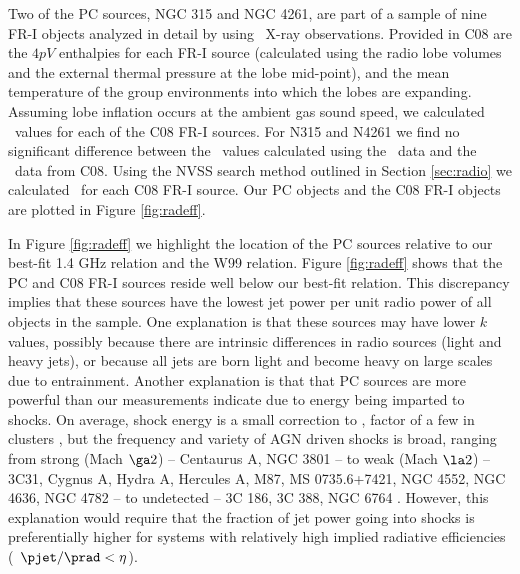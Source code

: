 \documentclass{emulateapj}
\begin{document}
Two of the PC sources, NGC 315 and NGC 4261, are part of a sample of
nine FR-I objects analyzed in detail by \citet[][hereafter
C08]{2008MNRAS.386.1709C} using \xmm\ X-ray observations. Provided in
C08 are the $4pV$ enthalpies for each FR-I source (calculated using
the radio lobe volumes and the external thermal pressure at the lobe
mid-point), and the mean temperature of the group environments into
which the lobes are expanding. Assuming lobe inflation occurs at the
ambient gas sound speed, we calculated \pcav\ values for each of the
C08 FR-I sources. For N315 and N4261 we find no significant difference
between the \pcav\ values calculated using the \chandra\ data and the
\xmm\ data from C08. Using the NVSS search method outlined in Section
\ref{sec:radio} we calculated \phigh\ for each C08 FR-I source. Our PC
objects and the C08 FR-I objects are plotted in Figure
\ref{fig:radeff}.

In Figure \ref{fig:radeff} we highlight the location of the PC sources
relative to our best-fit 1.4 GHz relation and the W99 relation. Figure
\ref{fig:radeff} shows that the PC and C08 FR-I sources reside well
below our best-fit relation. This discrepancy implies that these
sources have the lowest jet power per unit radio power of all objects
in the sample. One explanation is that these sources may have lower
$k$ values, possibly because there are intrinsic differences in radio
sources (light and heavy jets), or because all jets are born light and
become heavy on large scales due to entrainment. Another explanation
is that that PC sources are more powerful than our measurements
indicate due to energy being imparted to shocks. On average, shock
energy is a small correction to \pcav, factor of a few in clusters
\citep{mcnamrev}, but the frequency and variety of AGN driven shocks
is broad, ranging from strong (Mach $\ga 2$) -- Centaurus A, NGC 3801
\citep{2003ApJ...592..129K, 2009MNRAS.395.1999C, 2007ApJ...660..191C}
-- to weak (Mach $\la 2$) -- 3C31, Cygnus A, Hydra A, Hercules A, M87,
MS 0735.6+7421, NGC 4552, NGC 4636, NGC 4782
\citep{2002MNRAS.336.1161L, 2006ApJ...644L...9W, hydraa, herca,
  2007ApJ...665.1057F, ms0735, 2006ApJ...648..947M,
  2009arXiv0909.2942B, 2007ApJ...664..804M} -- to undetected -- 3C
186, 3C 388, NGC 6764 \citep{2008ApJ...684..811S, 2006ApJ...639..753K,
  2008ApJ...688..190C}. However, this explanation would require that
the fraction of jet power going into shocks is preferentially higher
for systems with relatively high implied radiative efficiencies
(\ie\ $\pjet/\prad < \eta$).
\end{document}
